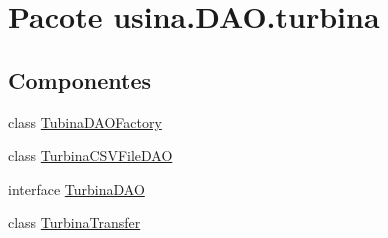 \hypertarget{namespaceusina_1_1_d_a_o_1_1turbina}{\section{Pacote usina.\-D\-A\-O.\-turbina}
\label{namespaceusina_1_1_d_a_o_1_1turbina}
}
\subsection*{Componentes}
\begin{DoxyCompactItemize}
\item 
class \hyperlink{classusina_1_1_d_a_o_1_1turbina_1_1_tubina_d_a_o_factory}{Tubina\-D\-A\-O\-Factory}
\item 
class \hyperlink{classusina_1_1_d_a_o_1_1turbina_1_1_turbina_c_s_v_file_d_a_o}{Turbina\-C\-S\-V\-File\-D\-A\-O}
\item 
interface \hyperlink{interfaceusina_1_1_d_a_o_1_1turbina_1_1_turbina_d_a_o}{Turbina\-D\-A\-O}
\item 
class \hyperlink{classusina_1_1_d_a_o_1_1turbina_1_1_turbina_transfer}{Turbina\-Transfer}
\end{DoxyCompactItemize}
